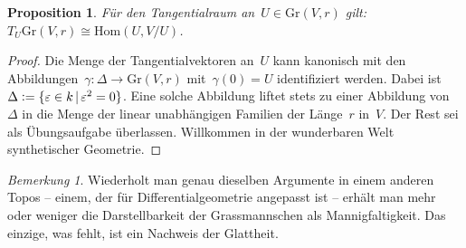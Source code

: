 \documentclass[a4paper,ngerman,12pt]{scrartcl}
\theoremstyle{definition}
\theoremstyle{plain}
\newtheorem{prop}[defn]{Proposition}
\theoremstyle{remark}
\newtheorem{rem}[defn]{Bemerkung}
\newcommand{\Hom}{\mathrm{Hom}}
\newcommand{\defeq}{\vcentcolon=}
\newcommand{\Gr}{\mathrm{Gr}}
\begin{document}
\begin{prop}Für den Tangentialraum an~$U \in \Gr(V,r)$ gilt:
$T_U \Gr(V,r) \cong \Hom(U, V/U)$.\end{prop}

\begin{proof}Die Menge der Tangentialvektoren an~$U$ kann kanonisch mit den
Abbildungen~$\gamma : \Delta \to \Gr(V,r)$ mit~$\gamma(0) = U$ identifiziert
werden. Dabei ist~$\Delta \defeq \{ \varepsilon \in k \,|\, \varepsilon^2 = 0 \}$.
Eine solche Abbildung liftet stets zu einer Abbildung von~$\Delta$ in die Menge
der linear unabhängigen Familien der Länge~$r$ in~$V$. Der Rest sei als
Übungsaufgabe überlassen. Willkommen in der wunderbaren Welt synthetischer
Geometrie.
\end{proof}

\enlargethispage{2em}

\begin{rem}Wiederholt man genau dieselben Argumente in einem anderen Topos --
einem, der für Differentialgeometrie angepasst ist -- erhält man mehr oder
weniger die Darstellbarkeit der Grassmannschen als Mannigfaltigkeit. Das
einzige, was fehlt, ist ein Nachweis der Glattheit.
\end{rem}
\end{document}
